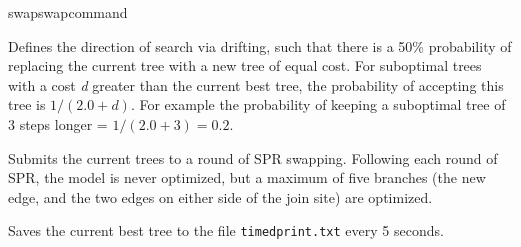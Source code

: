 \begin{command}{swap}{swapcommand}
\begin{poyexamples}
            {Defines the direction of search via drifting, such that there is a 50\% probability of 
            replacing the current tree with a new tree of equal cost.  For suboptimal trees with 
            a cost \emph{d} greater than the current best tree, the probability of accepting this tree 
            is $1 / (2.0 + d)$.  For example the
            probability of keeping a suboptimal tree of 3 steps longer = $1 / (2.0 + 3) = 0.2$.}
            
            {Submits the current trees to a round of SPR swapping.  Following each round of SPR,
            the model is never optimized, but a maximum of five branches (the new edge, and the two
                        edges on either side of the join site) are optimized.}
            
            {Saves the current best tree to the file \texttt{timedprint.txt} every 5 seconds.}
            
    \end{poyexamples}

    \begin{poyalso}
    \end{poyalso} 

\end{command}



   
